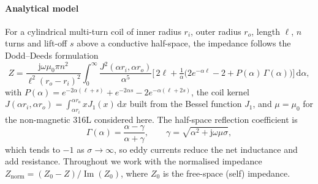 \documentclass[preprint]{elsarticle}
\begin{document}
\paragraph{Analytical model} For a cylindrical multi-turn coil of inner radius
$r_i$, outer radius $r_o$, length $\ell$, $n$ turns and lift-off $s$ above a
conductive half-space, the impedance follows the Dodd--Deeds
formulation~\cite{dodd1968,bowler2019,theodoulidis2006}
\begin{equation}
  Z = \frac{\mathrm{j}\omega\mu_0\pi n^2}{\ell^2 (r_o-r_i)^2}
  \int_0^\infty \frac{J^2(\alpha r_i,\alpha r_o)}{\alpha^5}
  \Big[\,2\ell + \tfrac{1}{\alpha}\big(2e^{-\alpha\ell}-2
  + P(\alpha)\,\Gamma(\alpha)\big)\Big]\,\mathrm{d}\alpha,
  \label{eq:dd}
\end{equation}
with $P(\alpha)=e^{-2\alpha(\ell+s)}+e^{-2\alpha s}-2e^{-\alpha(\ell+2s)}$, the
coil kernel $J(\alpha r_i,\alpha r_o)=\int_{\alpha r_i}^{\alpha r_o}
xJ_1(x)\,\mathrm{d}x$ built from the Bessel function $J_1$, and $\mu=\mu_0$ for
the non-magnetic 316L considered here. The half-space reflection coefficient is
\begin{equation}
  \Gamma(\alpha)=\frac{\alpha-\gamma}{\alpha+\gamma},
  \qquad \gamma=\sqrt{\alpha^2+\mathrm{j}\omega\mu\sigma},
  \label{eq:refl}
\end{equation}
which tends to $-1$ as $\sigma\to\infty$, so eddy currents reduce the net
inductance and add resistance. Throughout we work with the normalised impedance
$Z_{\mathrm{norm}}=(Z_0-Z)/\operatorname{Im}(Z_0)$, where $Z_0$ is the
free-space (self) impedance.
\end{document}
